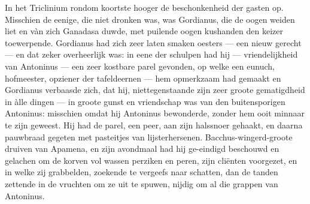 \documentclass[a4paper, 12pt, oneside, dutch]{article}
\begin{document}
In het Triclinium rondom koortste hooger de beschonkenheid der gasten op. Misschien de eenige, die niet dronken was, was Gordianus, die de oogen weiden liet en vàn zich Ganadasa duwde, met puilende oogen kushanden den keizer toewerpende. Gordianus had zich zeer laten smaken oesters --- een nieuw gerecht --- en dat zeker overheerlijk was: in eene der schulpen had hij --- vriendelijkheid van Antoninus --- een zeer kostbare parel gevonden, op welke een eunuch, hofmeester, opziener der tafeldeernen --- hem opmerkzaam had gemaakt en Gordianus verbaasde zich, dat hij, niettegenstaande zijn zeer groote gematigdheid in àlle dingen --- in groote gunst en vriendschap was van den buitensporigen Antoninus: misschien omdat hij Antoninus bewonderde, zonder hem ooit minnaar te zijn geweest. Hij had de parel, een peer, aan zijn halssnoer gehaakt, en daarna pauwbraad gegeten met pasteitjes van lijsterhersenen. Bacchus-wingerd-groote druiven van Apamena, en zijn avondmaal had hij ge-eindigd beschouwd en gelachen om de korven vol wassen perziken en peren, zijn cliënten voorgezet, en in welke zij grabbelden, zoekende te vergeefs naar schatten, dan de tanden zettende in de vruchten om ze uit te spuwen, nijdig om al die grappen van Antoninus.
\end{document}
